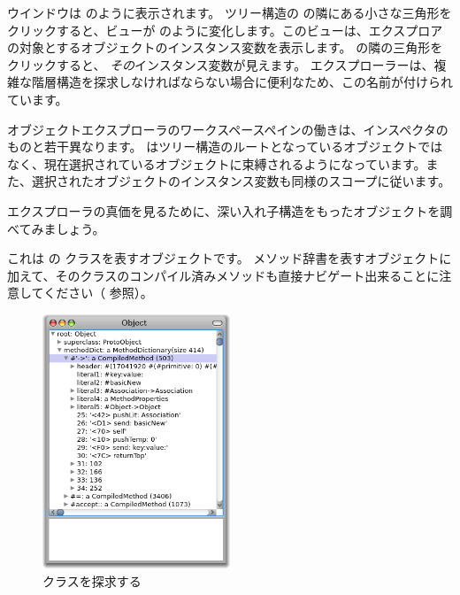 \documentclass[a4paper,10pt,twoside]{book}
\begin{document}
ウインドウは  のように表示されます。
ツリー構造の  の隣にある小さな三角形をクリックすると、ビューが  のように変化します。このビューは、エクスプロアの対象とするオブジェクトのインスタンス変数を表示します。
 の隣の三角形をクリックすると、 \emph{その}インスタンス変数が見えます。
エクスプローラーは、複雑な階層構造を探求しなければならない場合に便利なため、この名前が付けられています。

オブジェクトエクスプローラのワークスペースペインの働きは、インスペクタのものと若干異なります。
 はツリー構造のルートとなっているオブジェクトではなく、現在選択されているオブジェクトに束縛されるようになっています。また、選択されたオブジェクトのインスタンス変数も同様のスコープに従います。

エクスプローラの真価を見るために、深い入れ子構造をもったオブジェクトを調べてみましょう。

これは \pharo の  クラスを表すオブジェクトです。
メソッド辞書を表すオブジェクトに加えて、そのクラスのコンパイル済みメソッドも直接ナビゲート出来ることに注意してください（  参照）。

\begin{figure}[tbp]
\begin{center}
\includegraphics[width=0.5\textwidth]{ExploreObject}
\end{center}
\caption{ クラスを探求する}
\end{figure}
\end{document}
